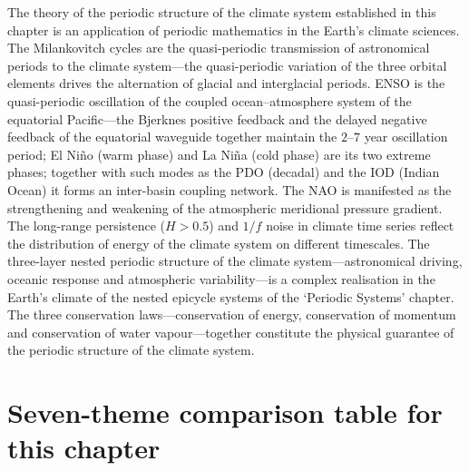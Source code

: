 \begin{remark}
The theory of the periodic structure of the climate system established in this chapter is an application of periodic mathematics in the Earth's climate sciences. The Milankovitch cycles are the quasi-periodic transmission of astronomical periods to the climate system---the quasi-periodic variation of the three orbital elements drives the alternation of glacial and interglacial periods. ENSO is the quasi-periodic oscillation of the coupled ocean--atmosphere system of the equatorial Pacific---the Bjerknes positive feedback and the delayed negative feedback of the equatorial waveguide together maintain the $2$--$7$ year oscillation period; El Niño (warm phase) and La Niña (cold phase) are its two extreme phases; together with such modes as the PDO (decadal) and the IOD (Indian Ocean) it forms an inter-basin coupling network. The NAO is manifested as the strengthening and weakening of the atmospheric meridional pressure gradient. The long-range persistence ($H > 0.5$) and $1/f$ noise in climate time series reflect the distribution of energy of the climate system on different timescales. The three-layer nested periodic structure of the climate system---astronomical driving, oceanic response and atmospheric variability---is a complex realisation in the Earth's climate of the nested epicycle systems of the `Periodic Systems' chapter. The three conservation laws---conservation of energy, conservation of momentum and conservation of water vapour---together constitute the physical guarantee of the periodic structure of the climate system.
\end{remark}

\section*{Seven-theme comparison table for this chapter}

